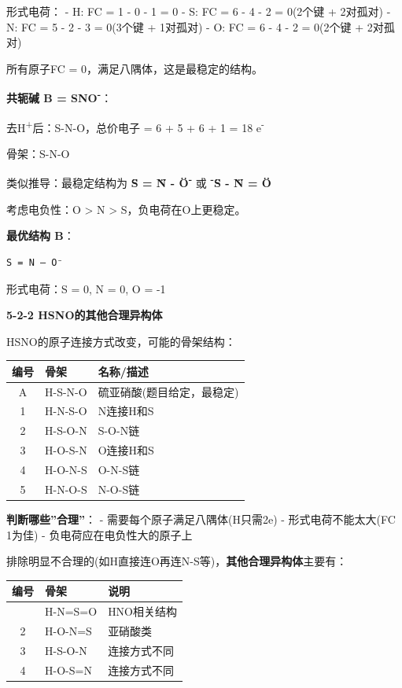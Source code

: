 形式电荷：
- H: FC = 1 - 0 - 1 = 0
- S: FC = 6 - 4 - 2 = 0(2个键 + 2对孤对)
- N: FC = 5 - 2 - 3 = 0(3个键 + 1对孤对)
- O: FC = 6 - 4 - 2 = 0(2个键 + 2对孤对)

所有原子FC = 0，满足八隅体，这是最稳定的结构。

\textbf{共轭碱 B = SNO\textsuperscript{-}}：

去H\textsuperscript{+}后：S-N-O，总价电子 = 6 + 5 + 6 + 1 = 18 e\textsuperscript{-}

骨架：S-N-O

类似推导：最稳定结构为 \textbf{S̈ = N̈ - Ö\textsuperscript{-}} 或 \textbf{\textsuperscript{-}S̈ - N̈ = Ö}

考虑电负性：O \textgreater{} N \textgreater{} S，负电荷在O上更稳定。

\textbf{最优结构 B}：

\begin{verbatim}
S = N — O⁻
\end{verbatim}

形式电荷：S = 0, N = 0, O = -1

\textbf{5-2-2 HSNO的其他合理异构体}

HSNO的原子连接方式改变，可能的骨架结构：

{\def\LTcaptype{none} %
\begin{longtable}[]{@{}cll@{}}
\toprule\noalign{}
编号 & 骨架 & 名称/描述 \\
\midrule\noalign{}
\endhead
\bottomrule\noalign{}
\endlastfoot
A & H-S-N-O & 硫亚硝酸(题目给定，最稳定) \\
1 & H-N-S-O & N连接H和S \\
2 & H-S-O-N & S-O-N链 \\
3 & H-O-S-N & O连接H和S \\
4 & H-O-N-S & O-N-S链 \\
5 & H-N-O-S & N-O-S链 \\
\end{longtable}
}

\textbf{判断哪些''合理''}：
- 需要每个原子满足八隅体(H只需2e)
- 形式电荷不能太大(\textbar FC\textbar{}  1为佳)
- 负电荷应在电负性大的原子上

排除明显不合理的(如H直接连O再连N-S等)，\textbf{其他合理异构体}主要有：

{\def\LTcaptype{none} %
\begin{longtable}[]{@{}cll@{}}
\toprule\noalign{}
编号 & 骨架 & 说明 \\
\midrule\noalign{}
\endhead
\bottomrule\noalign{}
\endlastfoot
1 & H-N=S=O & HNO相关结构 \\
2 & H-O-N=S & 亚硝酸类 \\
3 & H-S-O-N & 连接方式不同 \\
4 & H-O-S=N & 连接方式不同 \\
\end{longtable}
}

